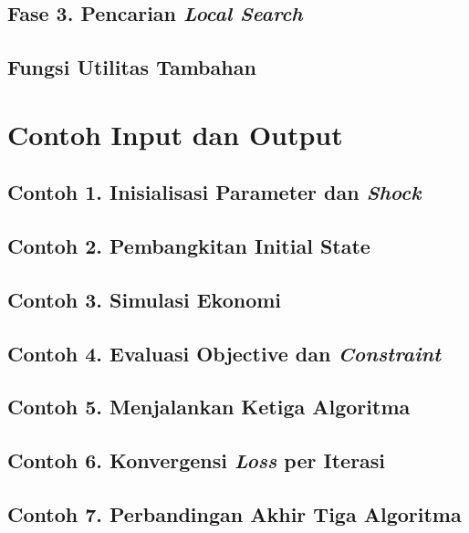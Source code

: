 \subsection*{Fase 3. Pencarian \textit{Local Search}}
\subsection*{Fungsi Utilitas Tambahan}
\clearpage
\section{Contoh Input dan Output}
\subsection*{Contoh 1. Inisialisasi Parameter dan \textit{Shock}}
\subsection*{Contoh 2. Pembangkitan Initial State}
\subsection*{Contoh 3. Simulasi Ekonomi}
\subsection*{Contoh 4. Evaluasi Objective dan \textit{Constraint}}
\subsection*{Contoh 5. Menjalankan Ketiga Algoritma}
\subsection*{Contoh 6. Konvergensi \textit{Loss} per Iterasi}
\subsection*{Contoh 7. Perbandingan Akhir Tiga Algoritma}
